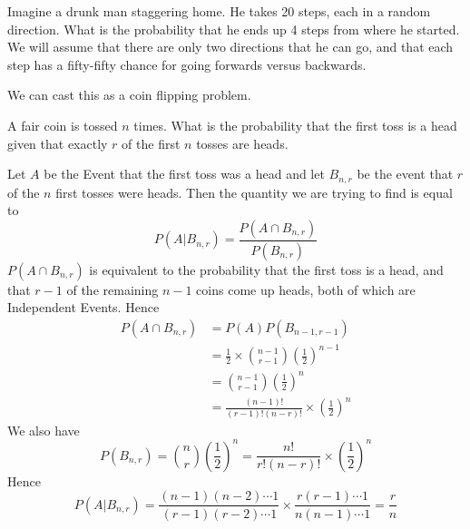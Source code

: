 \documentclass{report}
\begin{document}
\begin{example}
    Imagine a drunk man staggering home. He takes 20 steps, each in a random direction. What is the probability that he ends up 4 steps from where he started. We will assume that there are only two directions that he can go, and that each step has a fifty-fifty chance for going forwards versus backwards.

    We can cast this as a coin flipping problem. 
    \todo
\end{example}

\begin{example}
    A fair coin is tossed $n$ times. What is the probability that the first toss is a head given that exactly $r $ of the first $n$ tosses are heads.

    Let $A$ be the Event that the first toss was a head and let $B_{n,r}$ be the event that $r$ of the $n$ first tosses were heads. Then the quantity we are trying to find is equal to
    \[
        P(A|B_{n,r})=\frac{P(A\cap B_{n,r})}{P(B_{n,r})} 
    \] 
    $P(A\cap B_{n,r})$ is equivalent to the probability that the first toss is a head, and that $r-1$ of the remaining $n-1$ coins come up heads, both of which are Independent Events. Hence 
    \begin{align*}
        P(A\cap B_{n,r})
        &=P(A)P(B_{n-1,r-1})
        \\&=\frac 12 \times \binom{n-1}{r-1} \left(\frac 1 2 \right)^{n-1}
        \\&=\binom{n-1}{r-1} \left(\frac 1 2 \right)^{n}
        \\&=\frac{(n-1)!}{(r-1)!(n-r)!} \times \left(\frac 1 2 \right)^{n}
    \end{align*}
    We also have
    \[
        P(B_{n,r})=\binom{n}{r} \left(\frac 1 2 \right)^{n}=\frac{n!}{r!(n-r)!}\times \left(\frac 1 2 \right)^{n}
    \]
    Hence
    \[
        P(A|B_{n,r})=\frac{(n-1)(n-2)\cdots 1}{(r-1)(r-2)\cdots 1}\times \frac{r(r-1)\cdots 1}{n(n-1)\cdots 1}=\frac rn
    \]
\end{example}
\end{document}
